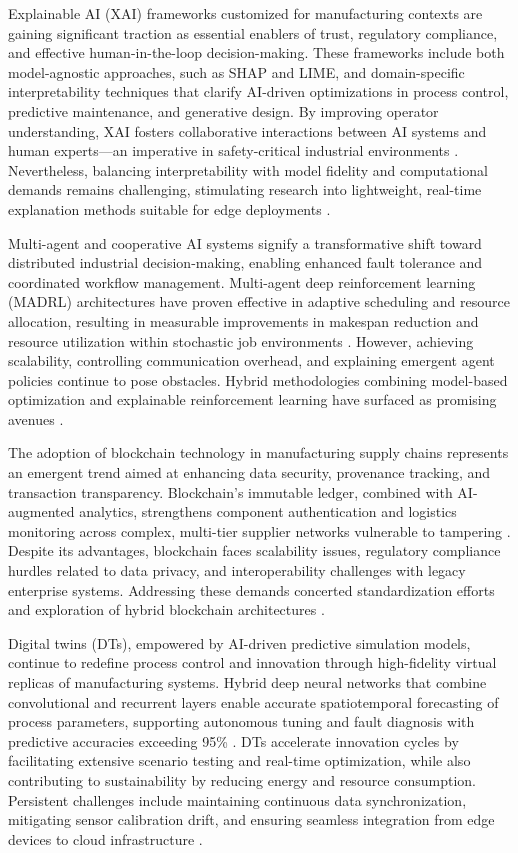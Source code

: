 \documentclass[sigconf]{acmart}
\begin{document}
Explainable AI (XAI) frameworks customized for manufacturing contexts are gaining significant traction as essential enablers of trust, regulatory compliance, and effective human-in-the-loop decision-making. These frameworks include both model-agnostic approaches, such as SHAP and LIME, and domain-specific interpretability techniques that clarify AI-driven optimizations in process control, predictive maintenance, and generative design. By improving operator understanding, XAI fosters collaborative interactions between AI systems and human experts—an imperative in safety-critical industrial environments \cite{ref35,ref44}. Nevertheless, balancing interpretability with model fidelity and computational demands remains challenging, stimulating research into lightweight, real-time explanation methods suitable for edge deployments \cite{ref38}.

Multi-agent and cooperative AI systems signify a transformative shift toward distributed industrial decision-making, enabling enhanced fault tolerance and coordinated workflow management. Multi-agent deep reinforcement learning (MADRL) architectures have proven effective in adaptive scheduling and resource allocation, resulting in measurable improvements in makespan reduction and resource utilization within stochastic job environments \cite{ref29}. However, achieving scalability, controlling communication overhead, and explaining emergent agent policies continue to pose obstacles. Hybrid methodologies combining model-based optimization and explainable reinforcement learning have surfaced as promising avenues \cite{ref29,ref37}.

The adoption of blockchain technology in manufacturing supply chains represents an emergent trend aimed at enhancing data security, provenance tracking, and transaction transparency. Blockchain's immutable ledger, combined with AI-augmented analytics, strengthens component authentication and logistics monitoring across complex, multi-tier supplier networks vulnerable to tampering \cite{ref25}. Despite its advantages, blockchain faces scalability issues, regulatory compliance hurdles related to data privacy, and interoperability challenges with legacy enterprise systems. Addressing these demands concerted standardization efforts and exploration of hybrid blockchain architectures \cite{ref41}.

Digital twins (DTs), empowered by AI-driven predictive simulation models, continue to redefine process control and innovation through high-fidelity virtual replicas of manufacturing systems. Hybrid deep neural networks that combine convolutional and recurrent layers enable accurate spatiotemporal forecasting of process parameters, supporting autonomous tuning and fault diagnosis with predictive accuracies exceeding 95\% \cite{ref26}. DTs accelerate innovation cycles by facilitating extensive scenario testing and real-time optimization, while also contributing to sustainability by reducing energy and resource consumption. Persistent challenges include maintaining continuous data synchronization, mitigating sensor calibration drift, and ensuring seamless integration from edge devices to cloud infrastructure \cite{ref26,ref38}.
\end{document}
